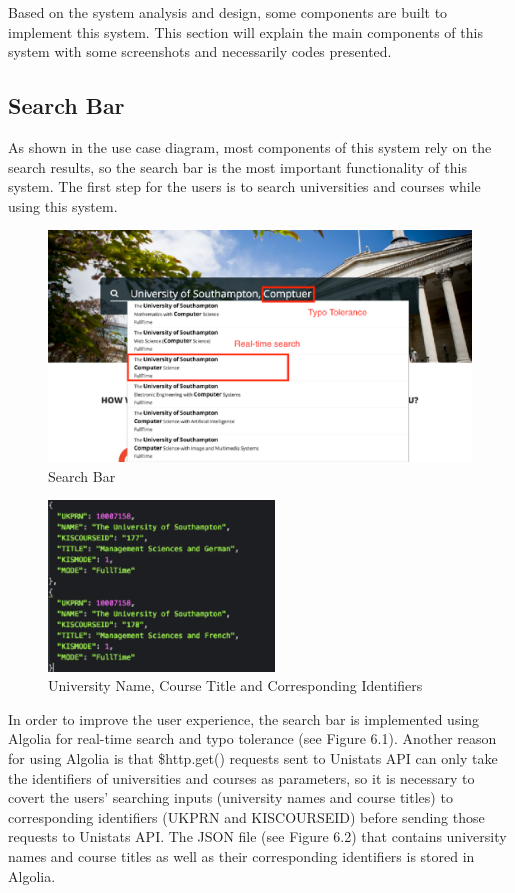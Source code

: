 Based on the system analysis and design, some components are built to implement this system. This section will explain the main components of this system with some screenshots and necessarily codes presented. 


\subsection{Search Bar
}	
As shown in the use case diagram, most components of this system rely on the search results, so the search bar is the most important functionality of this system. The first step for the users is to search universities and courses while using this system. 

\begin{figure}[H]
  \centering
  \includegraphics[width=15cm]{./img/Picture16}
  \caption{Search Bar}
  \label{Figure:figex}
\end{figure}

\begin{figure}[H]
  \centering
  \includegraphics[width=6cm]{./img/Picture17}
  \caption{University Name, Course Title and Corresponding Identifiers
}
  \label{Figure:figex}
\end{figure}

In order to improve the user experience, the search bar is implemented using Algolia \cite{Alogolia} for real-time search and typo tolerance (see Figure 6.1). Another reason for using Algolia is that \$http.get() requests sent to Unistats API can only take the identifiers of universities and courses as parameters, so it is necessary to covert the users’ searching inputs (university names and course titles) to corresponding identifiers (UKPRN and KISCOURSEID) before sending those requests to Unistats API. The JSON file (see Figure 6.2) that contains university names and course titles as well as their corresponding identifiers is stored in Algolia. 








